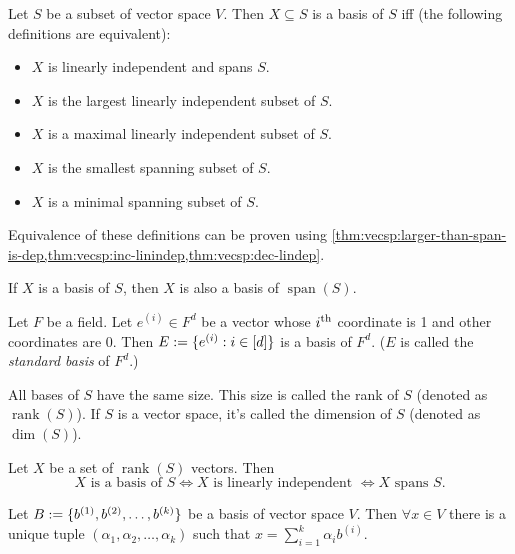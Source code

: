 \documentclass[a4paper,12pt,fleqn]{article}
\newenvironment*{tightemize}{\begin{itemize}[noitemsep]}{\end{itemize}}
\DeclareMathOperator{\Span}{span}
\DeclareMathOperator{\rank}{rank}
\begin{document}
\begin{definition}[Basis]
Let $S$ be a subset of vector space $V$.
Then $X \subseteq S$ is a basis of $S$ iff (the following definitions are equivalent):
\begin{tightemize}
\item $X$ is linearly independent and spans $S$.
\item $X$ is the largest linearly independent subset of $S$.
\item $X$ is a maximal linearly independent subset of $S$.
\item $X$ is the smallest spanning subset of $S$.
\item $X$ is a minimal spanning subset of $S$.
\end{tightemize}
\end{definition}
Equivalence of these definitions can be proven using
\cref{thm:vecsp:larger-than-span-is-dep,thm:vecsp:inc-linindep,thm:vecsp:dec-lindep}.

\begin{lemma}
If $X$ is a basis of $S$, then $X$ is also a basis of $\Span(S)$.
\end{lemma}

\begin{lemma}
Let $F$ be a field. Let $e^{(i)} \in F^d$ be a vector whose $i^{\textrm{th}}$ coordinate is 1
and other coordinates are 0. Then $E := \{e^{(i)}: i \in [d]\}$ is a basis of $F^d$.
($E$ is called the \emph{standard basis} of $F^d$.)
\end{lemma}

\begin{theorem}
All bases of $S$ have the same size. This size is called the rank of $S$ (denoted as $\rank(S)$).
If $S$ is a vector space, it's called the dimension of $S$ (denoted as $\dim(S)$).
\end{theorem}

\begin{theorem}
Let $X$ be a set of $\rank(S)$ vectors. Then
\[ X \textrm{ is a basis of } S \iff X \textrm{ is linearly independent } \iff X \textrm{ spans } S. \]
\end{theorem}

\begin{theorem}[Coordinatization]
Let $B := \{b^{(1)}, b^{(2)}, \ldots, b^{(k)}\}$ be a basis of vector space $V$.
Then $\forall x \in V$ there is a unique tuple $(\alpha_1, \alpha_2, \ldots, \alpha_k)$
such that $x = \sum_{i=1}^k \alpha_ib^{(i)}$.
\end{theorem}
\end{document}
